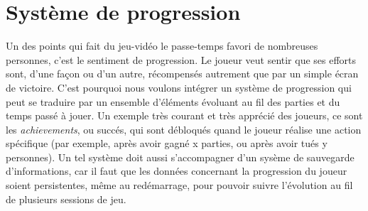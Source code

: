 \documentclass[../doc.tex]{subfiles}
\begin{document}
\section{Système de progression}
Un des points qui fait du jeu-vidéo le passe-temps
favori de nombreuses personnes, c'est le sentiment de
progression. Le joueur veut sentir que ses efforts sont,
d'une façon ou d'un autre, récompensés autrement que par un
simple écran de victoire. C'est pourquoi nous voulons intégrer
un système de progression qui peut se traduire par un ensemble
d'éléments évoluant au fil des parties et du temps passé à jouer.
\newline\indent
Un exemple très courant et très apprécié des joueurs, ce sont les
\textit{achievements}, ou succés, qui sont débloqués quand le joueur réalise
une action spécifique (par exemple, après avoir gagné x parties,
ou après avoir tués y personnes). Un tel système doit aussi s'accompagner d'un sysème de sauvegarde d'informations,
car il faut que les données concernant la progression du joueur
soient persistentes, même au redémarrage, pour pouvoir suivre l'évolution au fil de plusieurs sessions de jeu.
\end{document}

